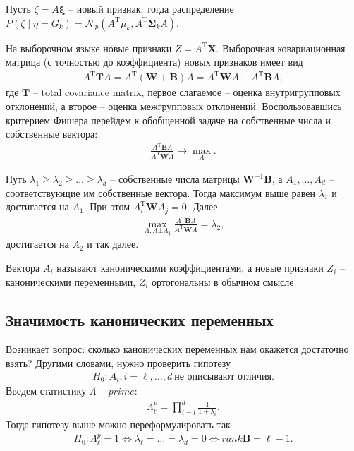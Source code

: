 \documentclass{article}
\begin{document}
Пусть $\zeta = A\boldsymbol{\xi}$ -- новый признак, тогда распределение $P(\zeta \mid \eta = G_k) = \mathcal{N}_p(A^\mathrm{T}\mu_k, A^\mathrm{T}\mathbf{\Sigma}_kA)$.

На выборочном языке новые признаки $Z =A^\mathrm{T}\mathbf{X}$. Выборочная ковариационная матрица (с точностью до коэффициента) новых признаков имеет вид
\begin{align*}
A^\mathrm{T}\mathbf{T}A = A^\mathrm{T}(\mathbf{W} + \mathbf{B})A = A^\mathrm{T}\mathbf{W}A + A^\mathrm{T}\mathbf{B}A,
\end{align*}
где $\mathbf{T}$ -- total covariance matrix, первое слагаемое -- оценка внутригрупповых отклонений, а второе -- оценка межгрупповых отклонений. Воспользовавшись критерием Фишера перейдем к обобщенной задаче на собственные числа и собственные вектора:
\begin{align*}
  \frac{A^\mathrm{T}\mathbf{B}A}{A^\mathrm{T}\mathbf{W}A} \rightarrow \max_{A}.
\end{align*}

Путь $\lambda_1 \geq \lambda_2 \geq \ldots \geq \lambda_d$ -- собственные числа матрицы $\mathbf{W}^{-1}\mathbf{B}$, а $A_1, \ldots, A_d$ -- соответствующие им собственные вектора. Тогда максимум выше равен $\lambda_1$  и достигается на $A_1$. При этом $A^\mathrm{T}_i \mathbf{W}A_j = 0$. Далее
\begin{align*}
  \max_{A, A \bot A_1}\frac{A^\mathrm{T}\mathbf{B}A}{A^\mathrm{T}\mathbf{W}A} = \lambda_2,
\end{align*}
достигается на $A_2$ и так далее.

Вектора $A_i$ называют каноническими коэффициентами, а новые признаки $Z_i$ -- каноническими переменными, $Z_i$ ортогональны в обычном смысле.



\subsection{Значимость канонических переменных}
Возникает вопрос: сколько канонических переменных нам окажется достаточно взять? Другими словами, нужно проверить гипотезу
\begin{align*}
  H_0: A_i, i = \ell,\ldots,d~\text{не описывают отличия}.
\end{align*}
Введем статистику $\Lambda-prime$:
\begin{align*}
\Lambda_\ell^p = \prod_{i = l}^d \frac{1}{1 + \lambda_i}.
\end{align*}
Тогда гипотезу выше можно переформулировать так
\begin{align*}
H_0: \Lambda_\ell^p = 1 \Leftrightarrow \lambda_\ell = \ldots = \lambda_d = 0 \Leftrightarrow rank \mathbf{B} = \ell - 1.
\end{align*}
\end{document}
